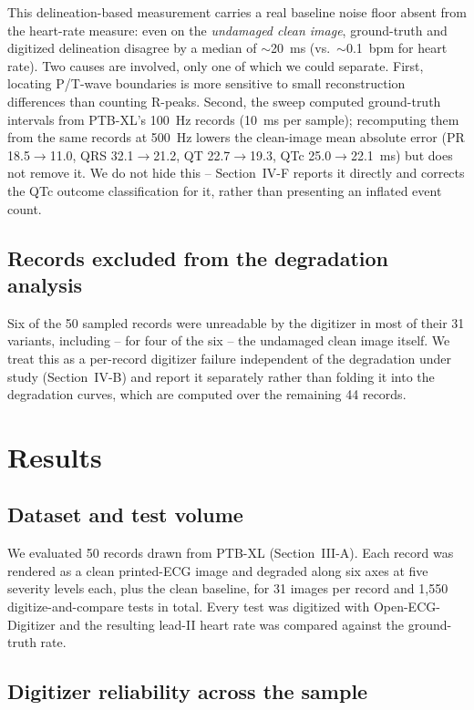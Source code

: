 \documentclass[conference]{IEEEtran}
\begin{document}
This delineation-based measurement carries a real baseline noise floor absent from
the heart-rate measure: even on the \emph{undamaged clean image}, ground-truth and
digitized delineation disagree by a median of $\sim$20~ms (vs.\ $\sim$0.1~bpm for
heart rate). Two causes are involved, only one of which we could separate. First,
locating P/T-wave boundaries is more sensitive to small reconstruction differences
than counting R-peaks. Second, the sweep computed ground-truth intervals from
PTB-XL's 100~Hz records (10~ms per sample); recomputing them from the same records
at 500~Hz lowers the clean-image mean absolute error (PR 18.5$\to$11.0, QRS
32.1$\to$21.2, QT 22.7$\to$19.3, QTc 25.0$\to$22.1~ms) but does not remove it. We do
not hide this -- Section~IV-F reports it directly and corrects the QTc outcome
classification for it, rather than presenting an inflated event count.

\subsection{Records excluded from the degradation analysis}

Six of the 50 sampled records were unreadable by the digitizer in most of their 31
variants, including -- for four of the six -- the undamaged clean image itself. We
treat this as a per-record digitizer failure independent of the degradation under
study (Section~IV-B) and report it separately rather than folding it into the
degradation curves, which are computed over the remaining 44 records.

\section{Results}

\subsection{Dataset and test volume}

We evaluated 50 records drawn from PTB-XL (Section~III-A). Each record was rendered
as a clean printed-ECG image and degraded along six axes at five severity levels
each, plus the clean baseline, for 31 images per record and 1{,}550
digitize-and-compare tests in total. Every test was digitized with
Open-ECG-Digitizer \cite{ref5} and the resulting lead-II heart rate was compared
against the ground-truth rate.

\subsection{Digitizer reliability across the sample}
\end{document}
